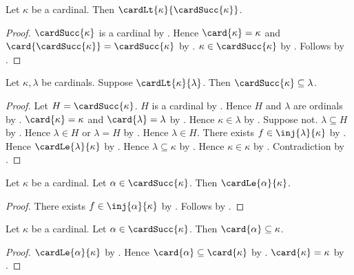 \begin{proposition}\label{cardinal_lt_successor}
    Let $\kappa$ be a cardinal.
    Then $\cardLt{\kappa}{\cardSucc{\kappa}}$.
\end{proposition}
\begin{proof}
    $\cardSucc{\kappa}$ is a cardinal
        by .
    Hence $\card{\kappa}=\kappa$ and
        $\card{\cardSucc{\kappa}}=\cardSucc{\kappa}$
        by .
    $\kappa\in\cardSucc{\kappa}$
        by .
    Follows by .
\end{proof}

\begin{theorem}\label{cardinal_successor_minimal}
    Let $\kappa,\lambda$ be cardinals.
    Suppose $\cardLt{\kappa}{\lambda}$.
    Then $\cardSucc{\kappa}\subseteq\lambda$.
\end{theorem}
\begin{proof}
    Let $H=\cardSucc{\kappa}$.
    $H$ is a cardinal by .
    Hence $H$ and $\lambda$ are ordinals
        by .
    $\card{\kappa}=\kappa$ and $\card{\lambda}=\lambda$
        by .
    Hence $\kappa\in\lambda$ by .
    Suppose not.
    $\lambda\subseteq H$ by .
    Hence $\lambda\in H$ or $\lambda=H$
        by .
    Hence $\lambda\in H$.
    There exists $f\in\inj{\lambda}{\kappa}$
        by .
    Hence $\cardLe{\lambda}{\kappa}$ by .
    Hence $\lambda\subseteq\kappa$
        by .
    Hence $\kappa\in\kappa$ by .
    Contradiction by .
\end{proof}

\begin{proposition}\label{below_cardinal_successor_cardinal_le}
    Let $\kappa$ be a cardinal.
    Let $\alpha\in\cardSucc{\kappa}$.
    Then $\cardLe{\alpha}{\kappa}$.
\end{proposition}
\begin{proof}
    There exists $f\in\inj{\alpha}{\kappa}$
        by .
    Follows by .
\end{proof}

\begin{proposition}\label{card_of_below_cardinal_successor}
    Let $\kappa$ be a cardinal.
    Let $\alpha\in\cardSucc{\kappa}$.
    Then $\card{\alpha}\subseteq\kappa$.
\end{proposition}
\begin{proof}
    $\cardLe{\alpha}{\kappa}$
        by .
    Hence $\card{\alpha}\subseteq\card{\kappa}$
        by .
    $\card{\kappa}=\kappa$ by .
\end{proof}

